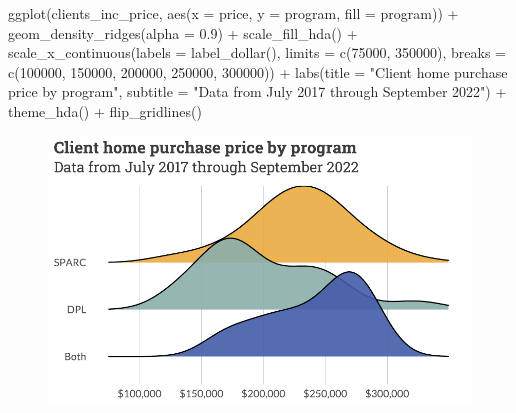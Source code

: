 \documentclass[
  letterpaper,
  DIV=11,
  numbers=noendperiod]{scrartcl}
\newenvironment{Shaded}{\begin{snugshade}}{\end{snugshade}}
\newcommand{\AttributeTok}[1]{\textcolor[rgb]{0.40,0.45,0.13}{#1}}
\newcommand{\DecValTok}[1]{\textcolor[rgb]{0.68,0.00,0.00}{#1}}
\newcommand{\FloatTok}[1]{\textcolor[rgb]{0.68,0.00,0.00}{#1}}
\newcommand{\FunctionTok}[1]{\textcolor[rgb]{0.28,0.35,0.67}{#1}}
\newcommand{\NormalTok}[1]{\textcolor[rgb]{0.00,0.23,0.31}{#1}}
\newcommand{\SpecialCharTok}[1]{\textcolor[rgb]{0.37,0.37,0.37}{#1}}
\newcommand{\StringTok}[1]{\textcolor[rgb]{0.13,0.47,0.30}{#1}}
\begin{document}
\begin{Shaded}
\begin{Highlighting}[]
\FunctionTok{ggplot}\NormalTok{(clients\_inc\_price, }\FunctionTok{aes}\NormalTok{(}\AttributeTok{x =}\NormalTok{ price, }\AttributeTok{y =}\NormalTok{ program, }\AttributeTok{fill =}\NormalTok{ program)) }\SpecialCharTok{+}
  \FunctionTok{geom\_density\_ridges}\NormalTok{(}\AttributeTok{alpha =} \FloatTok{0.9}\NormalTok{) }\SpecialCharTok{+}
  \FunctionTok{scale\_fill\_hda}\NormalTok{() }\SpecialCharTok{+}
  \FunctionTok{scale\_x\_continuous}\NormalTok{(}\AttributeTok{labels =} \FunctionTok{label\_dollar}\NormalTok{(),}
                     \AttributeTok{limits =} \FunctionTok{c}\NormalTok{(}\DecValTok{75000}\NormalTok{, }\DecValTok{350000}\NormalTok{),}
                     \AttributeTok{breaks =} \FunctionTok{c}\NormalTok{(}\DecValTok{100000}\NormalTok{, }\DecValTok{150000}\NormalTok{, }\DecValTok{200000}\NormalTok{, }\DecValTok{250000}\NormalTok{, }\DecValTok{300000}\NormalTok{)) }\SpecialCharTok{+}
  \FunctionTok{labs}\NormalTok{(}\AttributeTok{title =} \StringTok{"Client home purchase price by program"}\NormalTok{,}
       \AttributeTok{subtitle =} \StringTok{"Data from July 2017 through September 2022"}\NormalTok{) }\SpecialCharTok{+}
  \FunctionTok{theme\_hda}\NormalTok{() }\SpecialCharTok{+}
  \FunctionTok{flip\_gridlines}\NormalTok{()}
\end{Highlighting}
\end{Shaded}

\begin{figure}[H]

{\centering \includegraphics{piedmont_files/figure-pdf/price-plot-1.pdf}

}

\end{figure}
\end{document}
